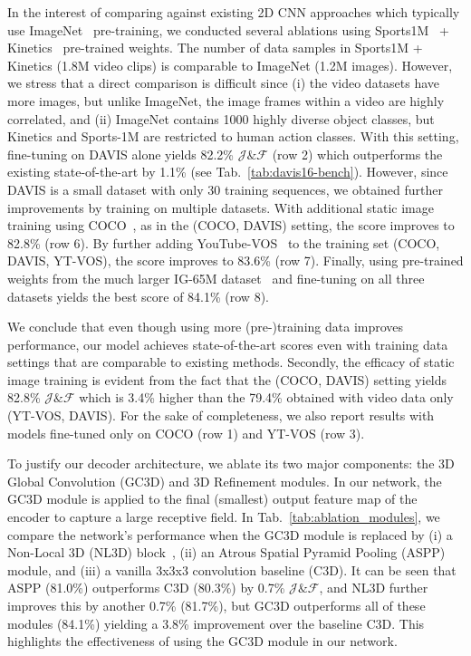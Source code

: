 \documentclass{bmvc2k}
\newcommand{\PAR}[1]{\vskip4pt \noindent {\bf #1~}}
\begin{document}
In the interest of comparing against existing 2D CNN approaches which typically use ImageNet~\cite{Deng09CVPR} pre-training, we conducted several ablations using Sports1M~\cite{Karpathy14CVPR} + Kinetics~\cite{Kay17ARXIV} pre-trained weights. 
The number of data samples in Sports1M + Kinetics (1.8M video clips) is comparable to ImageNet (1.2M images). However, we stress that a direct comparison is difficult since (i) the video datasets have more images, but unlike ImageNet, the image frames within a video are highly correlated, and (ii) ImageNet contains 1000 highly diverse object classes, but Kinetics and Sports-1M are restricted to human action classes. 
With this setting, fine-tuning on DAVIS alone yields 82.2\% $\mathcal{J\&F}$ (row 2) which outperforms the existing state-of-the-art by 1.1\% (see Tab.~\ref{tab:davis16-bench}). However, since DAVIS is a small dataset with only 30 training sequences, we obtained further improvements by training on multiple datasets. With additional static image training using COCO~\cite{Lin14ECCV}, as in the (COCO, DAVIS) setting, the score improves to 82.8\% (row 6). By further adding YouTube-VOS~\cite{Xu18ECCV} to the training set (COCO, DAVIS, YT-VOS), the score improves to 83.6\% (row 7). Finally, using pre-trained weights from the much larger IG-65M dataset~\cite{Ghadiyaram19CVPR} and fine-tuning on all three datasets yields the best score of 84.1\% (row 8).

We conclude that even though using more (pre-)training data improves performance, our model achieves state-of-the-art scores even with training data settings that are comparable to existing methods. Secondly, the efficacy of static image training is evident from the fact that the (COCO, DAVIS) setting yields 82.8\% $\mathcal{J\&F}$ which is 3.4\% higher than the 79.4\% obtained with video data only (YT-VOS, DAVIS). For the sake of completeness, we also report results with models fine-tuned only on COCO (row 1) and YT-VOS (row 3).



\PAR{Decoder:} To justify our decoder architecture, we ablate its two major components: the 3D Global Convolution (GC3D) and 3D Refinement modules.  
In our network, the GC3D module is applied to the final (smallest) output feature map of the encoder to capture a large receptive field. 
In Tab.~\ref{tab:ablation_modules}, we compare the network's performance when the GC3D module is replaced by (i) a Non-Local 3D (NL3D) block~\cite{Wang17CVPR}, (ii) an Atrous Spatial Pyramid Pooling (ASPP) module, and (iii) a vanilla 3x3x3 convolution baseline (C3D). It can be seen that ASPP (81.0\%) outperforms C3D (80.3\%) by 0.7\% $\mathcal{J\&F}$, and NL3D further improves this by another 0.7\% (81.7\%), but GC3D outperforms all of these modules (84.1\%) yielding a 3.8\% improvement over the baseline C3D. This highlights the effectiveness of using the GC3D module in our network.
\end{document}
